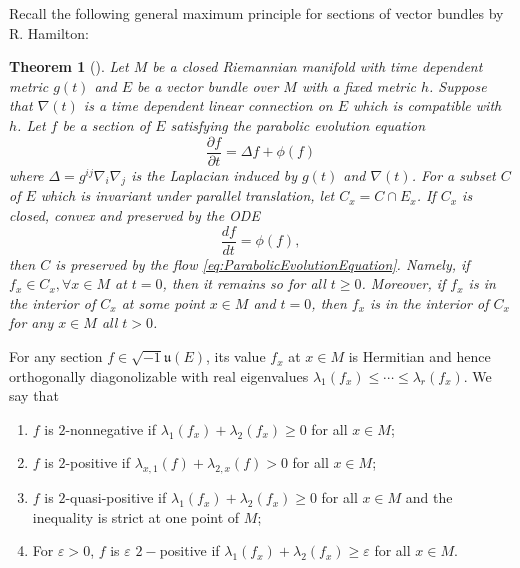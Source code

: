 \documentclass[11pt]{amsart}
\theoremstyle{plain}
\newtheorem{thm}{Theorem}[section]
\theoremstyle{definition}
\numberwithin{equation}{section}
\newcommand{\Li}[1]{\mathfrak{#1}}
\begin{document}
Recall the following general maximum principle for sections of vector bundles by R. Hamilton:
\begin{thm}[]\label{thm:HamiltonMaximumPrinciple}
    Let $M$ be a closed Riemannian manifold with time dependent metric $g(t)$ and $E$ be a vector bundle over $M$ with a fixed metric $h$. Suppose that $\nabla(t)$ is a time dependent linear connection on $E$ which is compatible with $h$. Let $f$ be a section of $E$ satisfying the parabolic evolution equation
    \begin{equation}\label{eq:ParabolicEvolutionEquation}
        \frac{\partial f}{\partial t}=\Delta f+\phi(f)
    \end{equation}
    where $\Delta=g^{ij}\nabla_i\nabla_j$ is the Laplacian induced by $g(t)$ and $\nabla(t)$. For a subset $C$ of $E$ which is invariant under parallel translation, let $C_x=C\cap E_x$. If $C_x$ is closed, convex and preserved by the ODE 
    \begin{equation}
        \frac{df}{dt}=\phi(f),
    \end{equation}
    then $C$ is preserved by the flow \ref{eq:ParabolicEvolutionEquation}. Namely, if $f_x\in C_x, \forall x\in M$ at $t=0$, then it remains so for all $t\ge 0$. Moreover, if $f_x$ is in the interior of $C_x$ at some point $x\in M$ and $t=0$, then $f_x$ is in the interior of $C_x$ for any $x\in M$ all $t>0$.
\end{thm}

For any section $f\in\sqrt{-1}\Li{u}(E)$, its value $f_x$ at $x\in M$ is Hermitian and hence orthogonally diagonolizable with real eigenvalues $\lambda_1(f_x)\leq\cdots\leq\lambda_r(f_x)$. We say that 
\begin{enumerate}
    \item $f$ is $2$-nonnegative if $\lambda_1(f_x)+\lambda_2(f_x)\ge 0$ for all $x\in M$;
    \item $f$ is $2$-positive if $\lambda_{x,1}(f)+\lambda_{2,x}(f)>0$ for all $x\in M$;
    \item $f$ is $2$-quasi-positive if $\lambda_1(f_x)+\lambda_2(f_x)\ge 0$ for all $x\in M$ and the inequality is strict at one point of $M$;
    \item For $\varepsilon>0$, $f$ is $\varepsilon$ $2-$positive if $\lambda_1(f_x)+\lambda_2(f_x)\ge\varepsilon$ for all $x\in M$.
\end{enumerate}  
\end{document}
